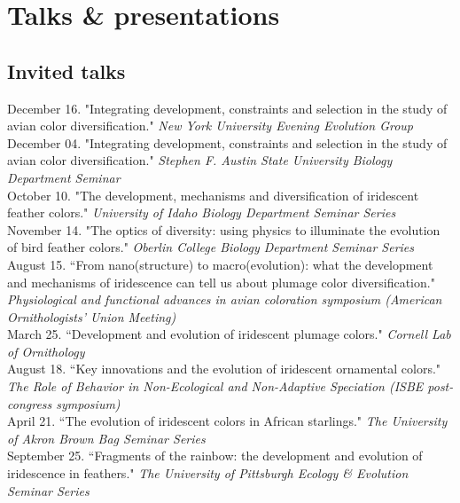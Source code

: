 \documentclass[10pt]{article}
\newcommand{\years}[1]{\marginnote{\raggedleft\scriptsize #1}}
\begin{document}
\section*{Talks \& presentations}

\subsection*{Invited talks}

\years{2015} December 16. "Integrating development, constraints and selection in the study of avian color diversification." \emph{New York University Evening Evolution Group}\\

\years{} December 04. "Integrating development, constraints and selection in the study of avian color diversification." \emph{Stephen F. Austin State University Biology Department Seminar}\\

\years{2014} October 10. "The development, mechanisms and diversification of iridescent feather colors." \emph{University of Idaho Biology Department Seminar Series}\\

\years{2013} November 14. "The optics of diversity: using physics to illuminate the evolution of bird feather colors." \emph{Oberlin College Biology Department Seminar Series}\\

\years{} August 15. “From nano(structure) to macro(evolution): what the development and mechanisms of
iridescence can tell us about plumage color diversification." \emph{Physiological and functional advances in avian coloration symposium (American Ornithologists' Union Meeting)}\\

\years{} March 25. “Development and evolution of iridescent plumage colors." \emph{Cornell Lab of Ornithology}\\

\years{2012} August 18. “Key innovations and the evolution of iridescent ornamental colors." \emph{The Role of Behavior in Non-Ecological and Non-Adaptive Speciation (ISBE post-congress symposium)}\\

\years{} April 21. “The evolution of iridescent colors in African starlings." \emph{The University of Akron Brown Bag Seminar Series}\\

\years{2011} September 25. “Fragments of the rainbow: the development and evolution of iridescence in feathers." \emph{The University of Pittsburgh Ecology \& Evolution Seminar Series} 
\end{document}
